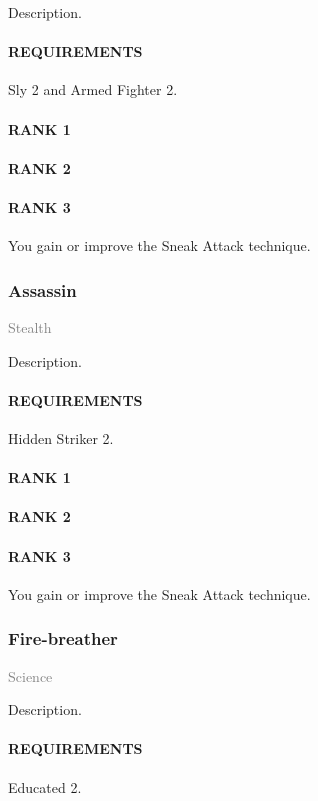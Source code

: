 \normalsize
Description.
\paragraph{REQUIREMENTS} Sly 2 and Armed Fighter 2.
\paragraph{RANK 1}
\paragraph{RANK 2}
\paragraph{RANK 3} You gain or improve the Sneak Attack technique.

\subsubsection{Assassin} \label{feat::assassin} %
\small{\textcolor{gray}{Stealth}}

\normalsize
Description.
\paragraph{REQUIREMENTS} Hidden Striker 2.
\paragraph{RANK 1}
\paragraph{RANK 2}
\paragraph{RANK 3} You gain or improve the Sneak Attack technique.

\subsubsection{Fire-breather} \label{feat::firebreather}
\small{\textcolor{gray}{Science}}

\normalsize
Description.
\paragraph{REQUIREMENTS} Educated 2.
